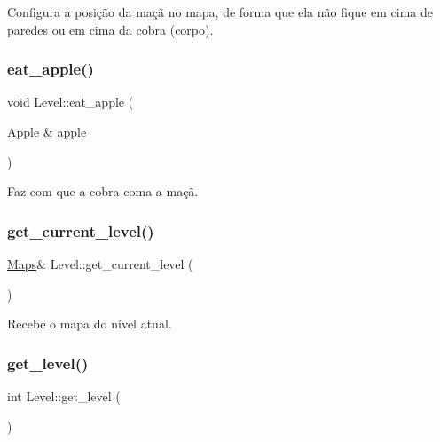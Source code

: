 Configura a posição da maçã no mapa, de forma que ela não fique em cima de paredes ou em cima da cobra (corpo). 

\mbox{\label{classLevel_a85a1a85f3d2a5e8438718e7438c383cd}} 
\subsubsection{\texorpdfstring{eat\+\_\+apple()}{eat\_apple()}}
{\footnotesize\ttfamily void Level\+::eat\+\_\+apple (\begin{DoxyParamCaption}\item[{\hyperlink{classApple}{Apple} \&}]{apple }\end{DoxyParamCaption})\hspace{0.3cm}{\ttfamily [inline]}}



Faz com que a cobra coma a maçã. 

\mbox{\label{classLevel_a1687e136ca75db79f5b3ac51a6f3c268}} 
\subsubsection{\texorpdfstring{get\+\_\+current\+\_\+level()}{get\_current\_level()}}
{\footnotesize\ttfamily \hyperlink{classMaps}{Maps}\& Level\+::get\+\_\+current\+\_\+level (\begin{DoxyParamCaption}{ }\end{DoxyParamCaption})\hspace{0.3cm}{\ttfamily [inline]}}



Recebe o mapa do nível atual. 

\mbox{\label{classLevel_a63a8d05dda7cbcfd812e8a99c47415e7}} 
\subsubsection{\texorpdfstring{get\+\_\+level()}{get\_level()}}
{\footnotesize\ttfamily int Level\+::get\+\_\+level (\begin{DoxyParamCaption}{ }\end{DoxyParamCaption})\hspace{0.3cm}{\ttfamily [inline]}}



